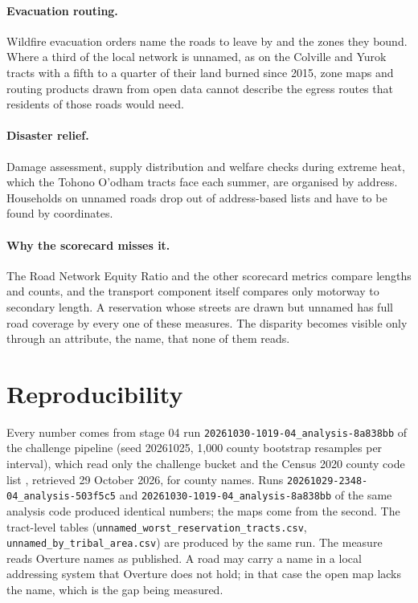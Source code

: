 \documentclass[11pt]{article}
\begin{document}
\paragraph{Evacuation routing.} Wildfire evacuation orders name the roads
to leave by and the zones they bound. Where a third of the local network is
unnamed, as on the Colville and Yurok tracts with a fifth to a quarter of
their land burned since 2015, zone maps and routing products drawn from open
data cannot describe the egress routes that residents of those roads would
need.

\paragraph{Disaster relief.} Damage assessment, supply distribution and
welfare checks during extreme heat, which the Tohono O'odham tracts face each
summer, are organised by address. Households on unnamed roads drop out of
address-based lists and have to be found by coordinates.

\paragraph{Why the scorecard misses it.} The Road Network Equity Ratio and
the other scorecard metrics compare lengths and counts, and the transport
component itself compares only motorway to secondary length. A reservation
whose streets are drawn but unnamed has full road coverage by every one of
these measures. The disparity becomes visible only through an attribute,
the name, that none of them reads.

\section{Reproducibility}

Every number comes from stage 04 run
\texttt{20261030-1019-04\_analysis-8a838bb} of the challenge pipeline (seed
20261025, 1,000 county bootstrap resamples per interval), which read only the
challenge bucket \cite{bucket} and the Census 2020 county code list \cite{countycodes}, retrieved 29
October 2026, for county names. Runs \texttt{20261029-2348-04\_analysis-503f5c5} and
\texttt{20261030-1019-04\_analysis-8a838bb} of the same analysis code produced
identical numbers; the maps come from the second.
The tract-level tables (\texttt{unnamed\_worst\_reservation\_tracts.csv},
\texttt{unnamed\_by\_tribal\_area.csv}) are produced by the same run.
The measure reads Overture names as published. A road may carry a name in a
local addressing system that Overture does not hold; in that case the open
map lacks the name, which is the gap being measured.
\end{document}
